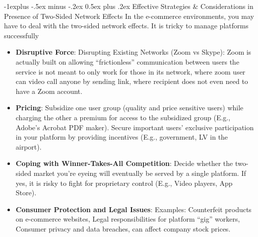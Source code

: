 \documentclass[12pt, landscape]{article}
\makeatletter
\renewcommand{\subsection}{\@startsection{subsection}{2}{0mm}%
                                {-1explus -.5ex minus -.2ex}%
                                {0.5ex plus .2ex}%
                                {\normalfont\normalsize\bfseries}}
\makeatother
\begin{document}
\begin{multicols*}{3}
\subsection{Effective Strategies \& Considerations in Presence of Two-Sided Network Effects}
In the e-commerce environments, you may have to deal with the two-sided network effects. It is tricky to manage platforms successfully
\begin{itemize}
\item \textbf{Disruptive Force}: Disrupting Existing Networks (Zoom vs Skype): Zoom is actually built on allowing “frictionless” communication between users the service is not meant to only work for those in its network, where zoom user can video call anyone by sending link, where recipient does not even need to have a Zoom account.
\item \textbf{Pricing}: Subsidize one user group (quality and price sensitive users) while charging the other a premium for access to the subsidized group (E.g., Adobe’s Acrobat PDF maker). Secure important users’ exclusive participation in your platform by providing incentives (E.g., government, LV in the airport).
\item \textbf{Coping with Winner-Takes-All Competition}: Decide whether the two-sided market you’re eyeing will eventually be served by a single platform. If yes, it is risky to fight for proprietary control (E.g., Video players, App Store).
\item \textbf{Consumer Protection and Legal Issues}: Examples: Counterfeit products on e-commerce websites, Legal responsibilities for platform “gig” workers, Consumer privacy and data breaches, can affect company stock prices.
\end{itemize}

\vfill\null
\columnbreak



\end{multicols*}
\end{document}
